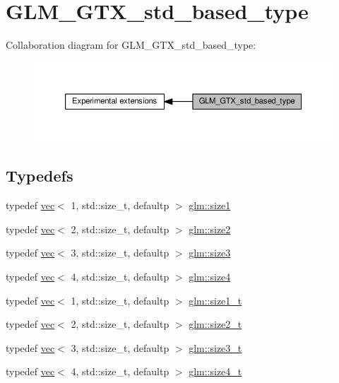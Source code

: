 \hypertarget{group__gtx__std__based__type}{}\section{G\+L\+M\+\_\+\+G\+T\+X\+\_\+std\+\_\+based\+\_\+type}
\label{group__gtx__std__based__type}
Collaboration diagram for G\+L\+M\+\_\+\+G\+T\+X\+\_\+std\+\_\+based\+\_\+type\+:
\nopagebreak
\begin{figure}[H]
\begin{center}
\leavevmode
\includegraphics[width=350pt]{df/dc7/group__gtx__std__based__type}
\end{center}
\end{figure}
\subsection*{Typedefs}
\begin{DoxyCompactItemize}
\item 
typedef \hyperlink{structglm_1_1vec}{vec}$<$ 1, std\+::size\+\_\+t, defaultp $>$ \hyperlink{group__gtx__std__based__type_gaf471290b8165697d088a943263fc8af1}{glm\+::size1}
\item 
typedef \hyperlink{structglm_1_1vec}{vec}$<$ 2, std\+::size\+\_\+t, defaultp $>$ \hyperlink{group__gtx__std__based__type_ga432937b68775c79e4556150e769c6e6b}{glm\+::size2}
\item 
typedef \hyperlink{structglm_1_1vec}{vec}$<$ 3, std\+::size\+\_\+t, defaultp $>$ \hyperlink{group__gtx__std__based__type_ga2da33d9da32b31af75f036d948b54de5}{glm\+::size3}
\item 
typedef \hyperlink{structglm_1_1vec}{vec}$<$ 4, std\+::size\+\_\+t, defaultp $>$ \hyperlink{group__gtx__std__based__type_ga6051b5077b52ff8ea48a5207d5076aa5}{glm\+::size4}
\item 
typedef \hyperlink{structglm_1_1vec}{vec}$<$ 1, std\+::size\+\_\+t, defaultp $>$ \hyperlink{group__gtx__std__based__type_ga5bf40bbca3cb66bbd7cc0c389c3c0c56}{glm\+::size1\+\_\+t}
\item 
typedef \hyperlink{structglm_1_1vec}{vec}$<$ 2, std\+::size\+\_\+t, defaultp $>$ \hyperlink{group__gtx__std__based__type_ga701549a040be1f2f6f661ddecde337de}{glm\+::size2\+\_\+t}
\item 
typedef \hyperlink{structglm_1_1vec}{vec}$<$ 3, std\+::size\+\_\+t, defaultp $>$ \hyperlink{group__gtx__std__based__type_gaf0ec088c61853e4ed8155ef66b3760a2}{glm\+::size3\+\_\+t}
\item 
typedef \hyperlink{structglm_1_1vec}{vec}$<$ 4, std\+::size\+\_\+t, defaultp $>$ \hyperlink{group__gtx__std__based__type_ga2bb2915bb83bb9d7a2967fe20aa7d2a5}{glm\+::size4\+\_\+t}
\end{DoxyCompactItemize}


